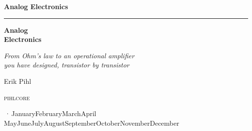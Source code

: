 %
\providecommand{\bookversion}{}
\newcommand{\bookdate}{\number\day\space\ifcase\month\or January\or February\or March\or April\or
  May\or June\or July\or August\or September\or October\or November\or December\fi\space
  \number\year}
\newcommand{\bookedition}{\ifx\bookversion\empty\else\bookversion\,·\,\fi\bookdate}

\thispagestyle{empty}
\vspace*{2.2in}
\begin{flushright}
  {\Large\bfseries Analog Electronics}
\end{flushright}
\cleardoublepage

\thispagestyle{empty}
\vspace*{1.1in}
\begin{flushleft}
  {\color{accent}\rule{0.9in}{2.5pt}}\par\vspace{1.4ex}
  {\fontsize{32}{38}\selectfont\bfseries Analog\\[0.15ex] Electronics\par}
  \vspace{2.2ex}
  {\Large\itshape From Ohm's law to an operational amplifier\\you have designed,
   transistor by transistor\par}
  \vspace{1.2in}
  {\large Erik Pihl\par}
  \vfill
  {\small\scshape\lsstyle pihlcore\par}
  \vspace{0.6ex}
  {\small\color{muted} \bookedition\par}
\end{flushleft}
\newpage

